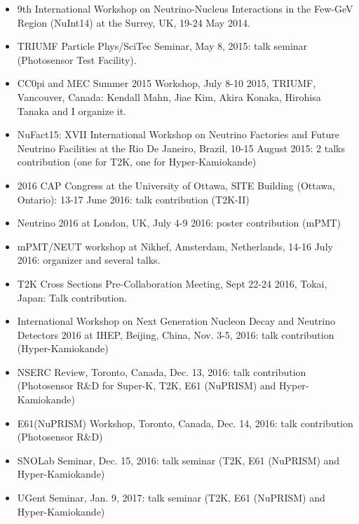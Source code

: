 \documentclass[11pt,a4paper,oneside,fleqn]{article}
\begin{document}
{\begin{itemize}
\item 9th International Workshop on Neutrino-Nucleus Interactions in the Few-GeV Region (NuInt14) at the Surrey, UK, 19-24 May 2014. 
\item TRIUMF Particle Phys/SciTec Seminar, May 8, 2015: talk seminar (Photosensor Test Facility).
\item CC0pi and MEC Summer 2015 Workshop, July 8-10 2015, TRIUMF, Vancouver, Canada: Kendall Mahn, Jiae Kim, Akira Konaka, Hirohisa Tanaka and I organize it.
\item NuFact15: XVII International Workshop on Neutrino Factories and Future Neutrino Facilities at the Rio De Janeiro, Brazil, 10-15 August 2015: 2 talks contribution (one for T2K, one for Hyper-Kamiokande)
\item 2016 CAP Congress at the University of Ottawa, SITE Building (Ottawa, Ontario): 13-17 June 2016: talk contribution (T2K-II)
\item Neutrino 2016 at London, UK, July 4-9 2016: poster contribution (mPMT)
\item mPMT/NEUT workshop at Nikhef, Amsterdam, Netherlands, 14-16 July 2016: organizer and several talks.%
\item T2K Cross Sections Pre-Collaboration Meeting, Sept 22-24 2016, Tokai, Japan: Talk contribution.
\item International Workshop on Next Generation Nucleon Decay and Neutrino Detectors 2016 at IHEP, Beijing, China, Nov. 3-5, 2016: talk contribution (Hyper-Kamiokande) 
\item NSERC Review, Toronto, Canada, Dec. 13, 2016: talk contribution (Photosensor R\&D for Super-K, T2K, E61 (NuPRISM) and Hyper-Kamiokande) 
\item E61(NuPRISM) Workshop, Toronto, Canada, Dec. 14, 2016: talk contribution (Photosensor R\&D) 
\item SNOLab Seminar, Dec. 15, 2016: talk seminar (T2K, E61 (NuPRISM) and Hyper-Kamiokande)
\item UGent Seminar, Jan. 9, 2017: talk seminar (T2K, E61 (NuPRISM) and Hyper-Kamiokande)

\end{itemize}
}
\end{document}
